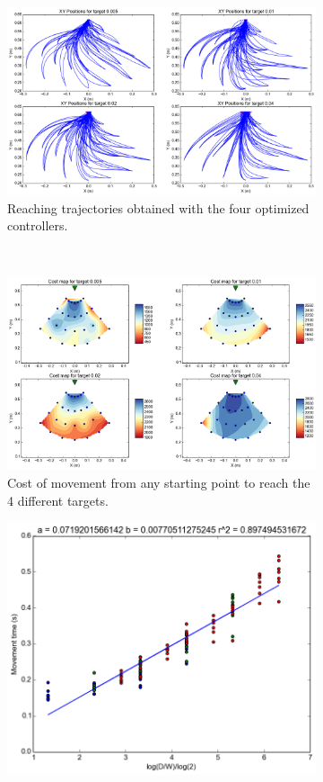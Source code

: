 \begin{figure}[t!]
 \centering
  \begin{subfigure}[t]{0.45\textwidth}
    \centering
    \includegraphics[width=0.9\linewidth]{images/trajs.png}
    \caption{Reaching trajectories obtained with the four optimized controllers.\label{fig:trajs}}
  \end{subfigure}%
  ~ 
  \begin{subfigure}[t]{0.45\textwidth}
    \centering
    \includegraphics[width=0.9\linewidth]{images/costmap.png}
    \caption{Cost of movement from any starting point to reach the 4 different targets.\label{fig:costmap}}
  \end{subfigure}%
  \linebreak
	\centering
  \begin{subfigure}[t]{0.45\textwidth}
    \centering
    \includegraphics[width=0.8\linewidth]{images/fitts.png}

\end{subfigure}
\end{figure}
